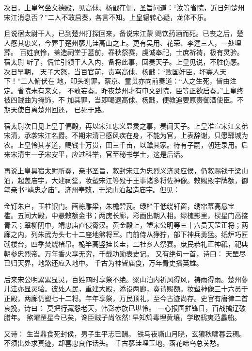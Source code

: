 次日，上皇驾坐文德殿，见高俅、杨戬在侧，圣旨问道：“汝等省院，近日知楚州
宋江消息否？”二人不敢启奏，各言不知。上皇辗转心疑，龙体不乐。

且说宿太尉干人，已到楚州打探回来，备说宋江蒙赐饮药酒而死。已丧之后，楚
人感其忠义，今葬于楚州蓼儿洼高山之上。更有吴用、花荣、李逵三人，一处埋葬。
百姓哀怜，盖造祠堂于墓前，春秋祭赛，虔诚奉祀，士庶祈祷，极有灵验。宿太尉
听了，慌忙引领干人入内，备将此事，回奏天子。上皇见说，不胜伤感。次日早朝，
天子大怒，当百官前，责骂高俅、杨戬：“败国奸臣，坏寡人天下！”二人俯伏在
地，叩头谢罪。蔡京、童贯亦向前奏道：“人之生死，皆由注定。省院未有来文，
不敢妄奏。昨夜楚州才有申文到院，臣等正欲启奏。”上皇终被四贼曲为掩饰，不
加其罪，当即喝退高俅、杨戬，便教追要原赍御酒使臣。不期天使自离楚州回还，
已死于路。

宿太尉次日见上皇于偏殿，再以宋江忠义显灵之事，奏闻天子。上皇准宣宋江亲弟
宋清，承袭宋江名爵。不期宋清已感风疾在身，不能为官，上表辞谢，只愿郓城为
农。上皇怜其孝道，赐钱十万贯，田三千亩，以赡其家。待有子嗣，朝廷录用。后
来宋清生一子宋安平，应过科举，官至秘书学士，这是后话。

再说上皇具宿太尉所奏，亲书圣旨，敕封宋江为忠烈义济灵应侯，仍敕赐钱于梁山
泊，起盖庙宇，大建祠堂，妆塑宋江等殁于王事诸多将佐神像。敕赐殿宇牌额，御
笔亲书“靖忠之庙”。济州奉敕，于梁山泊起造庙宇。但见：

金钉朱户，玉柱银门。画栋雕梁，朱檐碧瓦。绿栏干低绕轩窗，绣帘幕高悬宝
槛。五间大殿，中悬敕额金书；两庑长廊，彩画出朝入相。绿槐影里，棂星门高接
青云；翠柳阴中，靖忠庙直侵霄汉。黄金殿上，塑宋公明等三十六员天罡正将；两
廊之内，列朱武为头七十二座地煞将军。门前侍从狰狞，部下神兵勇猛。纸炉巧匠
砌楼台，四季焚烧楮帛。桅竿高竖挂长圭，二社乡人祭赛。庶民恭礼正神祇，祀典
朝参忠烈帝。万年香火享无穷，千载功勋表史记。
又有绝句一首，诗曰：
天罡尽已归天界，地煞还应入地中。
千古为神皆庙食，万年青史播英雄。

后来宋公明累累显灵，百姓四时享祭不绝。梁山泊内祈风得风，祷雨得雨。楚州蓼
儿洼亦显灵验。彼处人民，重建大殿，添设两廊，奏请赐额。妆塑神像三十六员于
正殿，两廊仍塑七十二将。年年享祭，万民顶礼，至今古迹尚存。史官有唐律二首
哀挽，诗曰：
莫把行藏怨老天，韩彭赤族已堪怜。
一心报国摧锋日，百战擒辽破腊年。
煞曜罡星今已矣，谗臣贼子尚依然!
早知鸩毒埋黄壤，学取鸱夷范蠡船。

又诗：
生当鼎食死封侯，男子生平志已酬。
铁马夜嘶山月晓，玄猿秋啸暮云稠。
不须出处求真迹，却喜忠良作话头。
千古蓼洼埋玉地，落花啼鸟总关愁。
